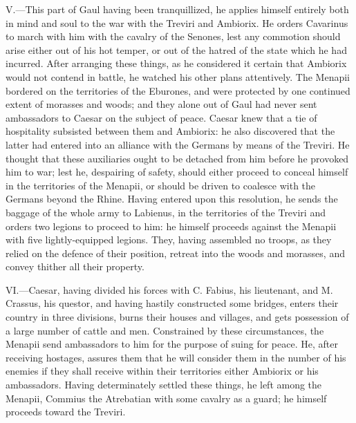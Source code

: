 V.—This part of Gaul having been tranquillized, he applies himself
entirely both in mind and soul to the war with the Treviri and Ambiorix.
He orders Cavarinus to march with him with the cavalry of the Senones,
lest any commotion should arise either out of his hot temper, or out of
the hatred of the state which he had incurred. After arranging these
things, as he considered it certain that Ambiorix would not contend in
battle, he watched his other plans attentively. The Menapii bordered on
the territories of the Eburones, and were protected by one continued
extent of morasses and woods; and they alone out of Gaul had never sent
ambassadors to Caesar on the subject of peace. Caesar knew that a tie of
hospitality subsisted between them and Ambiorix: he also discovered that
the latter had entered into an alliance with the Germans by means of the
Treviri. He thought that these auxiliaries ought to be detached from him
before he provoked him to war; lest he, despairing of safety, should
either proceed to conceal himself in the territories of the Menapii, or
should be driven to coalesce with the Germans beyond the Rhine. Having
entered upon this resolution, he sends the baggage of the whole army to
Labienus, in the territories of the Treviri and orders two legions to
proceed to him: he himself proceeds against the Menapii with five
lightly-equipped legions. They, having assembled no troops, as they
relied on the defence of their position, retreat into the woods and
morasses, and convey thither all their property.

VI.—Caesar, having divided his forces with C. Fabius, his lieutenant,
and M. Crassus, his questor, and having hastily constructed some
bridges, enters their country in three divisions, burns their houses and
villages, and gets possession of a large number of cattle and men.
Constrained by these circumstances, the Menapii send ambassadors to him
for the purpose of suing for peace. He, after receiving hostages,
assures them that he will consider them in the number of his enemies if
they shall receive within their territories either Ambiorix or his
ambassadors. Having determinately settled these things, he left among
the Menapii, Commius the Atrebatian with some cavalry as a guard; he
himself proceeds toward the Treviri.

